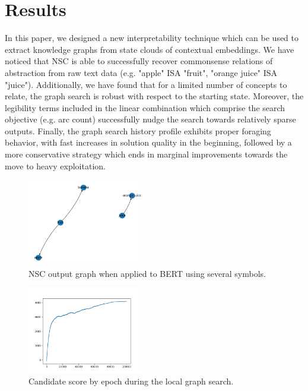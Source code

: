 \section{Results}\label{sec:results}

In this paper, we designed a new interpretability technique which can be used to extract knowledge graphs from state clouds of contextual embeddings. We have noticed that NSC is able to successfully recover commonsense relations of abstraction from raw text data (e.g. "apple" ISA "fruit", "orange juice" ISA "juice"). Additionally, we have found that for a limited number of concepts to relate, the graph search is robust with respect to the starting state. Moreover, the legibility terms included in the linear combination which comprise the search objective (e.g. arc count) successfully nudge the search towards relatively sparse outputs. Finally, the graph search history profile exhibits proper foraging behavior, with fast increases in solution quality in the beginning, followed by a more conservative strategy which ends in marginal improvements towards the move to heavy exploitation.

\begin{figure}[h]
    \centering
    \includegraphics[width=0.45\textwidth]{img/distinct graphs.png}
    \caption{NSC output graph when applied to BERT using several symbols.}\label{fig:nsc_results}
\end{figure}

\begin{figure}[h]
    \centering
    \includegraphics[width=0.45\textwidth]{img/score1.png}
    \caption{Candidate score by epoch during the local graph search.}\label{fig:nsc_results}
\end{figure}